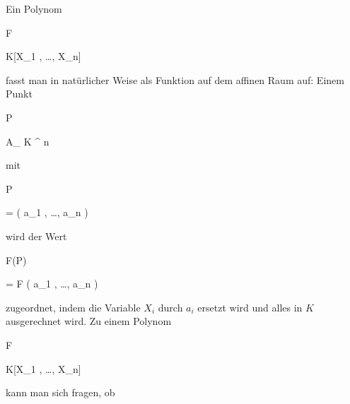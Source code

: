 Ein Polynom


\mavergleichskette


{\vergleichskette


{ F
}


{ \in }{ K[X_1 , \ldots , X_n]
}


{  }{
}


{    }{
}


{   }{
}


}
{}{}{}
fasst man in natürlicher Weise als Funktion auf dem affinen Raum auf: Einem Punkt


\mavergleichskette


{\vergleichskette


{ P
}


{ \in }{ { {\mathbb A}_{ K }^{ n  } }
}


{  }{
}


{    }{
}


{   }{
}


}
{}{}{}
mit


\mavergleichskette


{\vergleichskette


{ P
}


{ = }{ \left(  a_1 , \ldots , a_n  \right)
}


{  }{
}


{    }{
}


{   }{
}


}
{}{}{}
wird der Wert


\mavergleichskette


{\vergleichskette


{ F(P)
}


{ = }{ F \left(  a_1 , \ldots , a_n  \right)
}


{  }{
}


{    }{
}


{   }{
}


}
{}{}{}
zugeordnet, indem die Variable $X_i$ durch $a_i$ ersetzt wird und alles in $K$ ausgerechnet wird. Zu einem Polynom


\mavergleichskette


{\vergleichskette


{ F
}


{ \in }{ K[X_1 , \ldots , X_n]
}


{  }{
}


{    }{
}


{   }{
}


}
{}{}{}
kann man sich fragen, ob


\mavergleichskette


